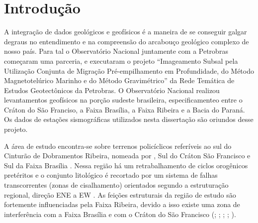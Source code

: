 \chapter{Introdução}

A integração de dados geológicos e geofísicos é a maneira de se conseguir galgar degraus no entendimento e na compreensão do arcabouço geológico complexo de nosso país. Para tal o Observatório Nacional juntamente com a Petrobras começaram uma parceria, e executaram o projeto “Imageamento Subsal pela Utilização Conjunta de Migração Pré-empilhamento em Profundidade, do Método Magnetotelúrico Marinho e do Método Gravimétrico” da Rede Temática de Estudos Geotectônicos da Petrobras. O Observatório Nacional realizou levantamentos geofísicos na porção sudeste brasileira, especificamenteo entre o Cráton do São Franciso, a Faixa Brasília, a Faixa Ribeira e a Bacia do Paraná. Os dados de estações sismográficas utilizados nesta dissertação são oriundos desse projeto.

A área de estudo encontra-se sobre terrenos policíclicos referíveis ao sul do Cinturão de Dobramentos Ribeira, nomeada por \cite{Riccomini_1989}, Sul do Cráton São Francisco e Sul da Faixa Brasília \citep{Almeida_Carneiro_1998}. Nessa região há um retrabalhamento de ciclos orogênicos pretéritos e o conjunto litológico é recortado por um sistema de falhas transcorrentes (zonas de cisalhamento) orientados segundo a estruturação regional, direção ENE a EW  \citep{Hasui_Sadowski_1976}. As feições estruturais da região de estudo são fortemente influenciadas pela Faixa Ribeira, devido a isso existe uma zona de interferência com a Faixa Brasília e com o Cráton do São Francisco (\cite{kuhn_metamorphic_2004}; \cite{heilbron_evolution_2010}; \cite{valeriano_u_pb_2011}; \cite{heilbron_serra_2013}; \cite{trouw_new_2013}).

